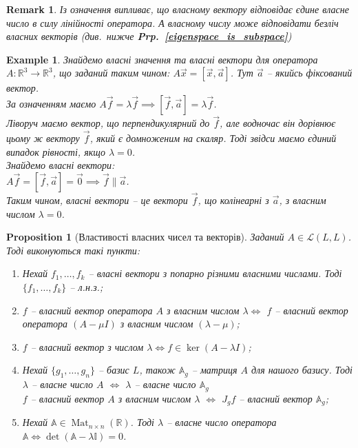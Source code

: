 \documentclass[a4paper, 10pt]{article}
\theoremstyle{theoremdd}
\newtheorem{example}[theorem]{Example}
\newtheorem{proposition}[theorem]{Proposition}
\newtheorem{remark}[theorem]{Remark}
\newcommand\prpref[1]{\textbf{Prp.~\ref{#1}}}
\DeclareMathOperator{\Mat}{Mat}
\begin{document}
\begin{remark}
Із означення випливає, що власному вектору відповідає \emph{єдине} власне число в силу лінійності оператора. А власному числу може відповідати безліч власних векторів (див.\ нижче \prpref{eigenspace_is_subspace})
\end{remark}

\begin{example}
Знайдемо власні значення та власні вектори для оператора $A \colon \mathbb{R}^3 \to \mathbb{R}^3$, що заданий таким чином: $A\vec{x} = [\vec{x}, \vec{a}]$. Тут $\vec{a}$ -- якийсь фіксований вектор.\\
За означенням маємо $A\vec{f} = \lambda \vec{f} \implies [\vec{f},\vec{a}] = \lambda \vec{f}$.\\
Ліворуч маємо вектор, що перпендикулярний до $\vec{f}$, але водночас він дорівнює цьому ж вектору $\vec{f}$, який є домноженим на скаляр. Тоді звідси маємо єдиний випадок рівності, якщо $\lambda = 0$.\\
Знайдемо власні вектори:\\
$A\vec{f} = [\vec{f}, \vec{a}] = \vec{0} \implies \vec{f} \parallel \vec{a}$.\\
Таким чином, власні вектори -- це вектори $\vec{f}$, що колінеарні з $\vec{a}$, з власним числом $\lambda = 0$.
\end{example}

\begin{proposition}[Властивості власних чисел та векторів]
Заданий $A \in \mathcal{L}(L,L)$. Тоді виконуються такі пункти:
\begin{enumerate}[nosep, wide=0pt, label={\arabic*)}]
\item Нехай $f_1,\dots,f_k$ -- власні вектори з попарно різними власними числами. Тоді $\{f_1,\dots,f_k\}$ -- л.н.з.;
\item $f$ -- власний вектор оператора $A$ з власним числом $\lambda \iff$ $f$ -- власний вектор оператора $(A - \mu I)$ з власним числом $(\lambda - \mu)$;
\item $f$ -- власний вектор з числом $\lambda \iff f \in \ker(A-\lambda I)$;
\item Нехай $\{g_1,\dots,g_n\}$ -- базис $L$, також $\mathbb{A}_g$ -- матриця $A$ для нашого базису.
Тоді \\
$\lambda$ -- власне число $A$ $\iff$ $\lambda$ -- власне число $\mathbb{A}_g$\\
$f$ -- власний вектор $A$ з власним числом $\lambda$ $\iff$ $J_g f$ -- власний вектор $\mathbb{A}_g$;
\item Нехай $\mathbb{A} \in \Mat_{n \times n}(\mathbb{R})$. Тоді $\lambda$ -- власне число оператора $\mathbb{A} \iff \det (\mathbb{A} - \lambda \mathbb{I}) = 0$.
\end{enumerate}
\end{proposition}
\end{document}
